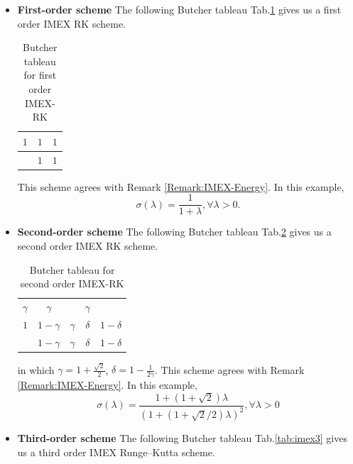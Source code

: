 \documentclass[a4paper, oneside]{book}
\begin{document}
\begin{itemize}
\item[(i)] {\bf First-order scheme}
The following Butcher tableau Tab.\ref{tab:imex1} gives us a first order IMEX RK scheme.
\begin{table}[h]
    \centering
    \begin{tabular}[h]{c|c|c}
        $1$ & $1$ & $1$\\
        \hline
        ~ & $1$ & $1$
    \end{tabular}
    \caption{Butcher tableau for first order IMEX-RK}\label{tab:imex1}
\end{table}

This scheme agrees with Remark \ref{Remark:IMEX-Energy}. 
In this example,
$$\sigma(\lambda) = \frac{1}{1+\lambda}, \forall \lambda > 0.$$


\item[(ii)] {\bf Second-order scheme}
The following Butcher tableau Tab.\ref{tab:imex2} gives us a second order IMEX RK scheme.
\begin{table}[h]
    \centering
    \begin{tabular}[h]{c|cc|cc}
        $\gamma$ & $\gamma$ & ~ & $\gamma$ & ~\\
        $1$ & $1- \gamma$ & $\gamma$ & $\delta$ & $1-\delta$\\
        \hline
        ~ & $1- \gamma$ & $\gamma$ & $\delta$ & $1-\delta$
    \end{tabular}
    \caption{Butcher tableau for second order IMEX-RK}\label{tab:imex2}
\end{table}

in which $\gamma = 1+\frac{\sqrt{2}}2$, $\delta = 1-\frac1{2\gamma}$.
This scheme agrees with Remark \ref{Remark:IMEX-Energy}. 
In this example,
$$\sigma(\lambda) = \frac{1+(1+\sqrt2)\lambda}{(1+(1+\sqrt2/2)\lambda)^2}, \forall \lambda > 0$$

\item[(iii)] {\bf Third-order scheme}
The following Butcher tableau Tab.\ref{tab:imex3} gives us a third order IMEX Runge--Kutta scheme.


\end{itemize}
\end{document}
